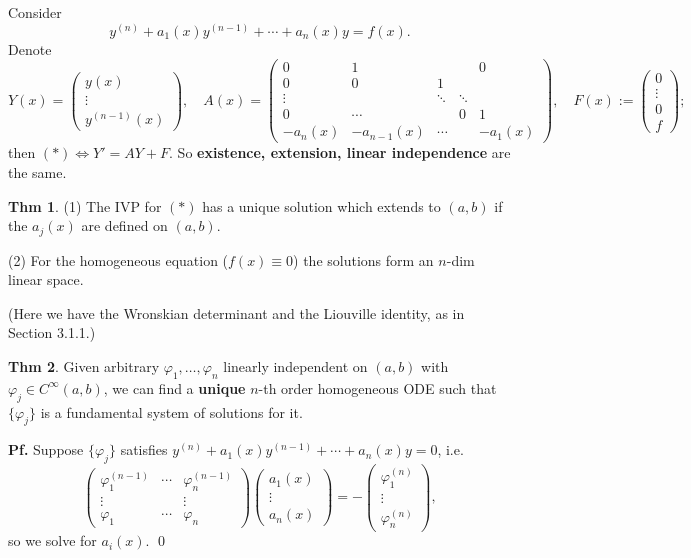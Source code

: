 \documentclass[11pt]{article}
\theoremstyle{definition}
\newtheorem*{theorem}{Thm}
\theoremstyle{remark}
\begin{document}
Consider
\begin{equation}
y^{(n)}+a_1(x)y^{(n-1)}+\cdots+a_n(x)y=f(x). \tag{$*$}
\end{equation}
Denote
\[
Y(x)=\begin{pmatrix} y(x)\\ \vdots\\ y^{(n-1)}(x) \end{pmatrix},\quad
A(x)=\begin{pmatrix} 0 & 1 & & & 0 \\ 0 & 0 & 1 & & \\ \vdots & & \ddots & \ddots & \\ 0 & \cdots & & 0 & 1 \\ -a_n(x) & -a_{n-1}(x) & \cdots & & -a_1(x) \end{pmatrix},\quad
F(x):=\begin{pmatrix} 0\\ \vdots\\ 0\\ f \end{pmatrix};
\]
then $(*) \iff Y'=AY+F$. So \textbf{existence, extension, linear independence} are the same.

\begin{theorem}
(1) The IVP for $(*)$ has a unique solution which extends to $(a,b)$ if the $a_j(x)$ are defined on
$(a,b)$.

(2) For the homogeneous equation ($f(x)\equiv0$) the solutions form an $n$-dim linear space.
\end{theorem}

(Here we have the Wronskian determinant and the Liouville identity, as in Section 3.1.1.)

\begin{theorem}
Given arbitrary $\varphi_1,\dots,\varphi_n$ linearly independent on $(a,b)$ with
$\varphi_j\in C^\infty(a,b)$, we can find a \textbf{unique} $n$-th order homogeneous ODE such that
$\{\varphi_j\}$ is a fundamental system of solutions for it.

\textbf{Pf.} Suppose $\{\varphi_j\}$ satisfies $y^{(n)}+a_1(x)y^{(n-1)}+\cdots+a_n(x)y=0$, i.e.
\[
\begin{pmatrix} \varphi_1^{(n-1)} & \cdots & \varphi_n^{(n-1)}\\ \vdots & & \vdots\\ \varphi_1 & \cdots & \varphi_n \end{pmatrix}
\begin{pmatrix} a_1(x)\\ \vdots\\ a_n(x) \end{pmatrix}
=-\begin{pmatrix} \varphi_1^{(n)}\\ \vdots\\ \varphi_n^{(n)} \end{pmatrix},
\]
so we solve for $a_i(x)$. \qed
\end{theorem}
\end{document}
